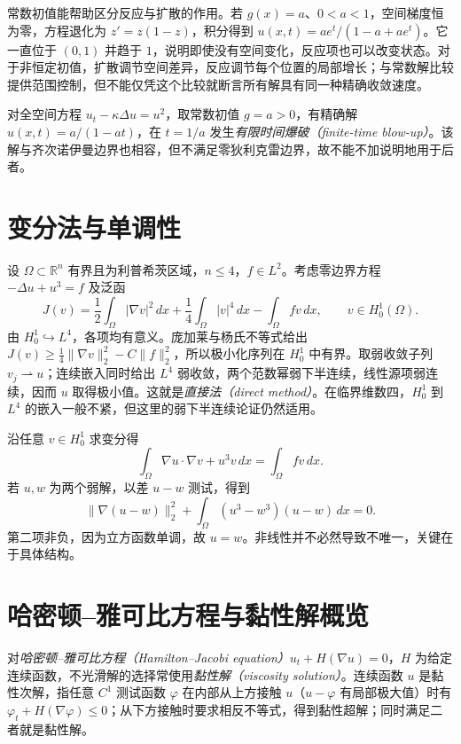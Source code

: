 常数初值能帮助区分反应与扩散的作用。若 $g(x)=a$、$0<a<1$，空间梯度恒为零，方程退化为 $z'=z(1-z)$，积分得到 $u(x,t)=a e^t/(1-a+a e^t)$。它一直位于 $(0,1)$ 并趋于 $1$，说明即使没有空间变化，反应项也可以改变状态。对于非恒定初值，扩散调节空间差异，反应调节每个位置的局部增长；与常数解比较提供范围控制，但不能仅凭这个比较就断言所有解具有同一种精确收敛速度。

\begin{example}
对全空间方程 $u_t-\kappa\Delta u=u^2$，取常数初值 $g=a>0$，有精确解 $u(x,t)=a/(1-at)$，在 $t=1/a$ 发生\emph{有限时间爆破（finite-time blow-up）}。该解与齐次诺伊曼边界也相容，但不满足零狄利克雷边界，故不能不加说明地用于后者。
\end{example}

\section{变分法与单调性}
设 $\Omega\subset\mathbb R^n$ 有界且为利普希茨区域，$n\le4$，$f\in L^2$。考虑零边界方程 $-\Delta u+u^3=f$ 及泛函
\begin{equation}
 J(v)=\frac12\int_\Omega|\nabla v|^2\,dx+
      \frac14\int_\Omega|v|^4\,dx-\int_\Omega fv\,dx,
 \qquad v\in H_0^1(\Omega).
 \label{eq:nonlinear-functional}
\end{equation}
由 $H_0^1\hookrightarrow L^4$，各项均有意义。庞加莱与杨氏不等式给出 $J(v)\ge\frac14\|\nabla v\|_2^2-C\|f\|_2^2$，所以极小化序列在 $H_0^1$ 中有界。取弱收敛子列 $v_j\rightharpoonup u$；连续嵌入同时给出 $L^4$ 弱收敛，两个范数幂弱下半连续，线性源项弱连续，因而 $u$ 取得极小值。这就是\emph{直接法（direct method）}。在临界维数四，$H_0^1$ 到 $L^4$ 的嵌入一般不紧，但这里的弱下半连续论证仍然适用。

沿任意 $v\in H_0^1$ 求变分得
\[
 \int_\Omega\nabla u\cdot\nabla v+u^3v\,dx=\int_\Omega fv\,dx.
\]
若 $u,w$ 为两个弱解，以差 $u-w$ 测试，得到
\[
 \|\nabla(u-w)\|_2^2+\int_\Omega(u^3-w^3)(u-w)\,dx=0.
\]
第二项非负，因为立方函数单调，故 $u=w$。非线性并不必然导致不唯一，关键在于具体结构。

\section{哈密顿--雅可比方程与黏性解概览}
对\emph{哈密顿--雅可比方程（Hamilton--Jacobi equation）}$u_t+H(\nabla u)=0$，$H$ 为给定连续函数，不光滑解的选择常使用\emph{黏性解（viscosity solution）}。连续函数 $u$ 是黏性次解，指任意 $C^1$ 测试函数 $\varphi$ 在内部从上方接触 $u$（$u-\varphi$ 有局部极大值）时有 $\varphi_t+H(\nabla\varphi)\le0$；从下方接触时要求相反不等式，得到黏性超解；同时满足二者就是黏性解。

